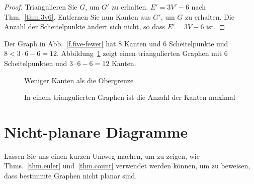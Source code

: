 \begin{proof}
Triangulieren Sie $G$, um $G'$ zu erhalten. $E'= 3V'-6$ nach Thm.~\ref{thm.3v6}. Entfernen Sie nun Kanten aus $G'$, um $G$ zu erhalten. Die Anzahl der Scheitelpunkte ändert sich nicht, so dass $E'= 3V-6$ ist.
\end{proof}

\begin{example}
Der Graph in Abb.~\ref{f.five-fewer} hat $8$ Kanten und $6$ Scheitelpunkte und $8< 3\cdot 6 - 6= 12$.
Abbildung~\ref{f.five-upper-limit} zeigt einen triangulierten Graphen mit $6$ Scheitelpunkten und $3\cdot 6 - 6= 12$ Kanten.
\end{example}

\begin{figure}[t]
\begin{minipage}{.4\textwidth}
\begin{center}
\caption{Weniger Kanten als die Obergrenze}\label{f.five-fewer}
\end{center}
\end{minipage}
\hfill
\begin{minipage}{.55\textwidth}
\begin{center}
\caption{In einem triangulierten Graphen ist die Anzahl der Kanten maximal}\label{f.five-upper-limit}
\end{center}
\end{minipage}
\end{figure}

\section{Nicht-planare Diagramme}\label{s.nonplanar}

Lassen Sie uns einen kurzen Umweg machen, um zu zeigen, wie Thms.~\ref{thm.euler} und~\ref{thm.count} verwendet werden können, um zu beweisen, dass bestimmte Graphen nicht planar sind.

